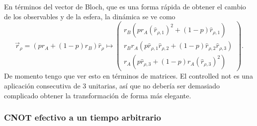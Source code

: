 En términos del vector de Bloch, que es una forma rápida de obtener el cambio de los observables y de la esfera, la dinámica se ve como
\begin{equation*}
    \vec{r}_{\rho}=(pr_{A}+(1-p)r_{B})\hat{r}_{\rho}\mapsto\begin{pmatrix}
        r_{B}(pr_{A}(\hat{r}_{\rho,1})^2+(1-p)\hat{r}_{\rho,1})\\
        r_{B}r_{A}(p\hat{r}_{\rho,1}\hat{r}_{\rho,2}+(1-p)\hat{r}_{\rho,2}\hat{r}_{\rho,3})\\
        r_{A}(p\hat{r}_{\rho,3}+(1-p)r_{A}(\hat{r}_{\rho,3})^{2})
    \end{pmatrix}.
  \end{equation*}
  De momento tengo que ver esto en términos de matrices. El controlled not es una aplicación consecutiva de 3 unitarias, así que no debería ser demasiado complicado obtener la transformación de forma más elegante.

\subsubsection{CNOT efectivo a un tiempo arbitrario}
